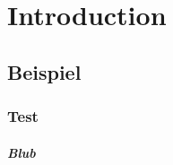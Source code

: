 \chapter{Introduction} \label{ch:introduction}
\parencite{test.2022}

\textcite{test.2022}

\section{Beispiel} \label{sec:beispiel}

\subsection{Test} \label{subsec:test}

\paragraph{Blub} \label{par:blub}